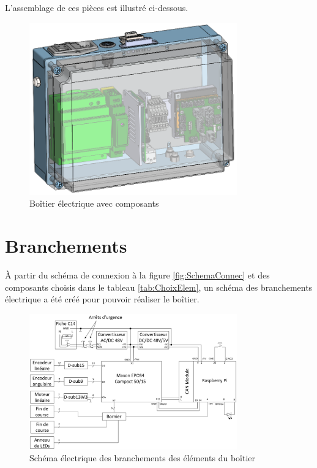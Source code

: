L'assemblage de ces pièces est illustré ci-dessous.

\begin{figure}[H]
    \centering
    \includegraphics[width = 0.8\textwidth]{assets/figures/AssemblageBoitierElectrique.png}
    \caption{Boîtier électrique avec composants}
    \label{fig:AssBoitierElec}
\end{figure}

\section{Branchements}\label{sec:Branche}

À partir du schéma de connexion à la figure \ref{fig:SchemaConnec} et des composants choisis dans le tableau \ref{tab:ChoixElem}, un schéma
des branchements électrique a été créé pour pouvoir réaliser le boîtier.

\begin{figure}[H]
    \centering
    \includegraphics[width = 0.8\textwidth]{assets/figures/SchemaElectrique.svg}
    \caption{Schéma électrique des branchements des éléments du boîtier}
    \label{fig:SchemaElec}
\end{figure}

